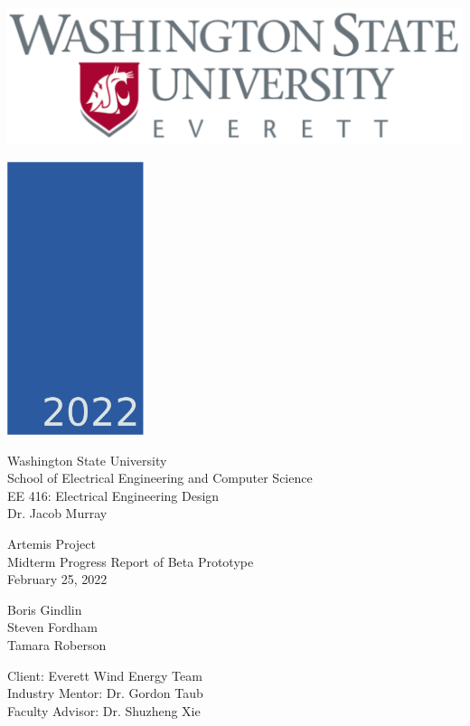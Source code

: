 \documentclass[11pt,letterpaper,conference]{IEEEtran}
\begin{document}
\begin{titlepage}
    \begin{minipage}[t]{0.45\textwidth}
        \begin{flushleft}
            \includegraphics[valign=t,width=\textwidth]{images/wsu.png}
        \end{flushleft}
    \end{minipage}
    \begin{minipage}[t]{0.45\textwidth}
        \begin{flushright}
            \includegraphics[valign=t,width=0.3\textwidth]{images/2022.png}
        \end{flushright}
    \end{minipage}


    \centering
    \vspace*{5cm}

    Washington State University \\
    School of Electrical Engineering and Computer Science \\
    EE 416: Electrical Engineering Design \\
    Dr. Jacob Murray

    \vspace*{2cm}
    Artemis Project \\
    Midterm Progress Report of Beta Prototype \\
    February 25, 2022

    \vspace*{1cm}
    Boris Gindlin \\
    Steven Fordham \\
    Tamara Roberson

    \vspace*{1cm}
    Client: Everett Wind Energy Team \\
    Industry Mentor: Dr. Gordon Taub \\
    Faculty Advisor: Dr. Shuzheng Xie
\end{titlepage}
\end{document}
